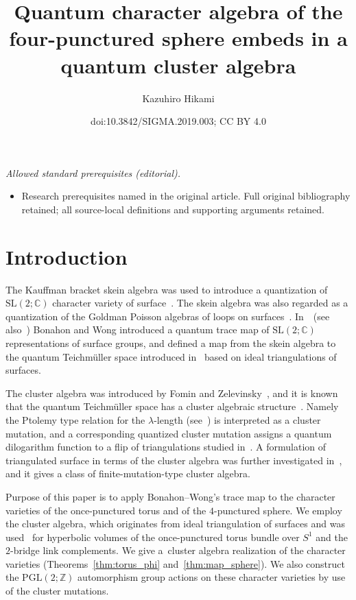 \documentclass[10pt,a4paper]{amsart}
\title{Quantum character algebra of the four-punctured sphere embeds in a quantum cluster algebra}
\author{Kazuhiro Hikami}
\date{doi:10.3842/SIGMA.2019.003; CC BY 4.0}
\numberwithin{equation}{section}
\begin{document}
\maketitle
\noindent\textit{Allowed standard prerequisites (editorial).}\begin{itemize}
\item Research prerequisites named in the original article. Full original bibliography retained; all source-local definitions and supporting arguments retained.
\end{itemize}\medskip
\section{Introduction}
The Kauffman bracket skein algebra was used to introduce a quantization of $\mathrm{SL}(2;\mathbb{C})$ character variety of surface~\cite{PrzytSikor00a}. The skein algebra was also regarded as a quantization of the Goldman Poisson algebras of loops on surfaces~\cite{VGTura91b}. In~\cite{BonaWong11a,BonaWong16b}~(see also~\cite{AllegHKKim17a, TQLe16a}) Bonahon and Wong introduced a quantum trace map of
$\mathrm{SL}(2;\mathbb{C})$ representations of surface groups, and defined a map from the skein algebra to the quantum Teichm{\"u}ller space introduced in~\cite{ChekFock99a, Kasha98a} based on ideal triangulations of surfaces.

The cluster algebra was introduced by Fomin and Zelevinsky~\cite{FominZelev02a}, and it is known that the quantum Teichm{\"u}ller space has a cluster algebraic structure~\cite{FockGonc06b,GekhShapVain05a}. Namely
the Ptolemy type relation for the $\lambda$-length (see~\cite{Penner12}) is interpreted as a cluster mutation, and a corresponding quantized cluster mutation assigns a quantum dilogarithm function to a flip of triangulations studied in~\cite{Kasha98a}. A formulation of triangulated surface in terms of the cluster algebra was further investigated in~\cite{FomiShapThur08a}, and it gives a class of finite-mutation-type cluster algebra.

Purpose of this paper is to apply Bonahon--Wong's trace map to the character varieties of the once-punctured torus and of the $4$-punctured sphere. We employ the cluster algebra, which originates from ideal triangulation of surfaces and was used~\cite{HikamiRInoue12a} for hyperbolic volumes of the once-punctured torus bundle over $S^1$ and the $2$-bridge link complements. We give a~cluster algebra realization of the character varieties (Theorems~\ref{thm:torus_phi} and~\ref{thm:map_sphere}). We also construct the $\mathrm{PGL}(2;\mathbb{Z})$ automorphism group actions on these character varieties by use of the cluster mutations.
\end{document}
